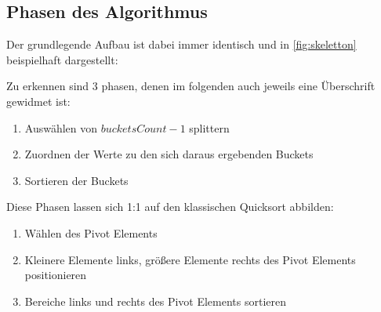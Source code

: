 	\subsection{Phasen des Algorithmus}
		Der grundlegende Aufbau ist dabei immer identisch und in \ref{fig:skeletton} beispielhaft dargestellt:
		
		Zu erkennen sind 3 phasen, denen im folgenden auch jeweils eine Überschrift gewidmet ist:
		\begin{enumerate}
			\item Auswählen von $\textit{bucketsCount}-1$ splittern
			\item Zuordnen der Werte zu den sich daraus ergebenden Buckets
			\item Sortieren der Buckets
		\end{enumerate}
		Diese Phasen lassen sich 1:1 auf den klassischen Quicksort abbilden:
		\begin{enumerate}
			\item Wählen des Pivot Elements
			\item Kleinere Elemente links, größere Elemente rechts des Pivot Elements positionieren
			\item Bereiche links und rechts des Pivot Elements sortieren
		\end{enumerate}
		

